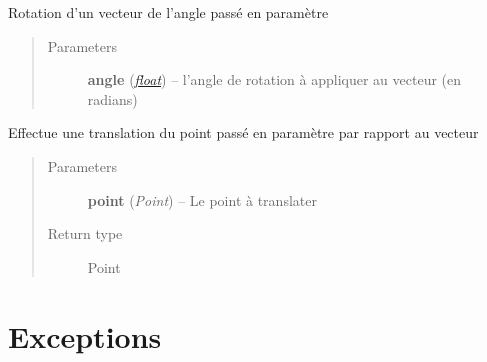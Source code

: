 \documentclass[letterpaper,10pt,english]{sphinxmanual}
\begin{document}
\begin{fulllineitems}
\begin{fulllineitems}
\begin{quote}
\begin{description}
\end{description}\end{quote}

\end{fulllineitems}


\begin{fulllineitems}
\label{index:Graphique.Vecteur.rotation}
Rotation d'un vecteur de l'angle passé en paramètre
\begin{quote}\begin{description}
\item[{Parameters}] \leavevmode
\textbf{angle} (\href{http://docs.python.org/library/functions.html\#float}{\emph{float}}) -- l'angle de rotation à appliquer au vecteur (en radians)

\end{description}\end{quote}

\end{fulllineitems}


\begin{fulllineitems}
\label{index:Graphique.Vecteur.translationPoint}
Effectue une translation du point passé en paramètre par rapport au vecteur
\begin{quote}\begin{description}
\item[{Parameters}] \leavevmode
\textbf{point} (\emph{Point}) -- Le point à translater

\item[{Return type}] \leavevmode
Point

\end{description}\end{quote}

\end{fulllineitems}


\end{fulllineitems}



\chapter{Exceptions}
\label{index:module-Exceptions}\label{index:exceptions}
\end{document}
